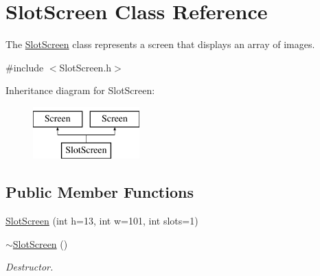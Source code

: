 \hypertarget{classSlotScreen}{\section{Slot\-Screen Class Reference}
\label{classSlotScreen}
}


The \hyperlink{classSlotScreen}{Slot\-Screen} class represents a screen that displays an array of images.  




{\ttfamily \#include $<$Slot\-Screen.\-h$>$}

Inheritance diagram for Slot\-Screen\-:\begin{figure}[H]
\begin{center}
\leavevmode
\includegraphics[height=2.000000cm]{classSlotScreen}
\end{center}
\end{figure}
\subsection*{Public Member Functions}
\begin{DoxyCompactItemize}
\item 
\hyperlink{classSlotScreen_a55b2a1537eb5cf4735f624e50946bc5a}{Slot\-Screen} (int h=13, int w=101, int slots=1)
\item 
\hyperlink{classSlotScreen_a1978a574c2835aeafd746ff3813c7253}{$\sim$\-Slot\-Screen} ()
\begin{DoxyCompactList}\small\item\em Destructor. \end{DoxyCompactList}\end{DoxyCompactItemize}
